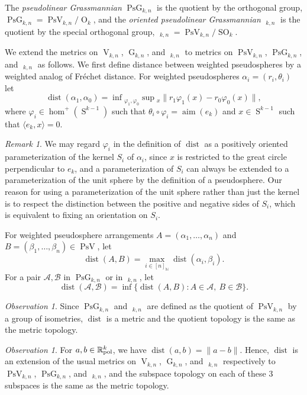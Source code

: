 \documentclass[11pt]{article}
\numberwithin{equation}{section}
\theoremstyle{remark}
\newtheorem{remark}[theorem]{Remark}
\newtheorem{observation}[theorem]{Observation}
\let\mc\mathcal
\let\mb\mathbb
\let\df\emph
\let\phi\varphi
\DeclareMathOperator{\dist}{dist}
\DeclareMathOperator{\pg}{PsG}
\DeclareMathOperator{\pog}{Ps\widetilde G}
\DeclareMathOperator{\g}{G}
\DeclareMathOperator{\oG}{\widetilde G}
\DeclareMathOperator{\orth}{O}
\DeclareMathOperator{\sorth}{SO}
\DeclareMathOperator{\stief}{V}
\DeclareMathOperator{\pstief}{PsV}
\DeclareMathOperator{\sphere}{S}
\newcommand{\Rpol}[1]{\mb{R}\mathrlap{{}^{#1}}{}_\text{pol}}
\DeclareMathOperator{\aim}{aim}
\begin{document}
The \df{pseudolinear Grassmannian} $\pg_{k,n}$ is the quotient by the orthogonal group, $\pg_{k,n} = \pstief_{k,n} / \orth_k$, and the \df{oriented pseudolinear Grassmannian} $\pog_{k,n}$ is the quotient by the special orthogonal group, $\pog_{k,n} = \pstief_{k,n} / \sorth_k$.

We extend the metrics on $\stief_{k,n}$, $\g_{k,n}$, and $\oG_{k,n}$ to metrics on $\pstief_{k,n}$, $\pg_{k,n}$, and $\pog_{k,n}$ as follows.
We first define distance between weighted pseudospheres by a weighted analog of Fréchet distance.
For weighted pseudospheres $\alpha_i = (r_i,\theta_i)$ let
\[ \dist(\alpha_1,\alpha_0) = \inf{}_{\phi_1, \phi_0} \sup{}_{x}\| r_1 \phi_1(x) - r_0 \phi_0(x)\|, \]
where $ \phi_i \in \hom^+(\sphere^{k-1})$ such that $\theta_i \circ \phi_i = \aim(e_k)$
and $x \in \sphere^{k-1}$ such that $\langle e_k, x\rangle = 0$.

\begin{remark}
We may regard $\phi_i$ in the definition of $\dist$ as a positively oriented parameterization of the kernel $S_{i}$ of $\alpha_i$,
since $x$ is restricted to the great circle perpendicular to $e_k$,
and a parameterization of $S_i$ can always be extended to a param\-eterization of the unit sphere by the definition of a pseudosphere.
Our reason for using a parameterization of the unit sphere rather than just the kernel is to respect the distinction between the positive and negative sides of $S_i$, which is equivalent to fixing an orientation on $S_i$.
\end{remark}

For weighted pseudosphere arrangements ${A} = (\alpha_1,\dots,\alpha_n)$ and ${B} = (\beta_1,\dots,\beta_n) \in \pstief$, let
\[ \dist({A},{B}) = \max_{i\in [n]_{\mb{N}}} \dist(\alpha_i,\beta_i). \]
For a pair $\mc{A},\mc{B}$ in $\pg_{k,n}$ or in $\pog_{k,n}$, let
\[ \dist(\mc{A},\mc{B}) = \inf\{ \dist(A,B):A \in \mc{A},\ B \in \mc{B} \}. \]

\begin{observation}
Since $\pg_{k,n}$ and $\pog_{k,n}$ are defined as the quotient of $\pstief_{k,n}$ by a group of isometries, $\dist$ is a metric and the quotient topology is the same as the metric topology.
\end{observation}

\begin{observation}
For $a,b \in \Rpol{k}$, we have $\dist(a,b) = \|a-b\|$. Hence, $\dist$ is an extension of the usual metrics on $\stief_{k,n}$, $\g_{k,n}$, and $\oG_{k,n}$ respectively to $\pstief_{k,n}$, $\pg_{k,n}$, and $\pog_{k,n}$, and the subspace topology on each of these $3$ subspaces is the same as the metric topology.
\end{observation}
\end{document}
